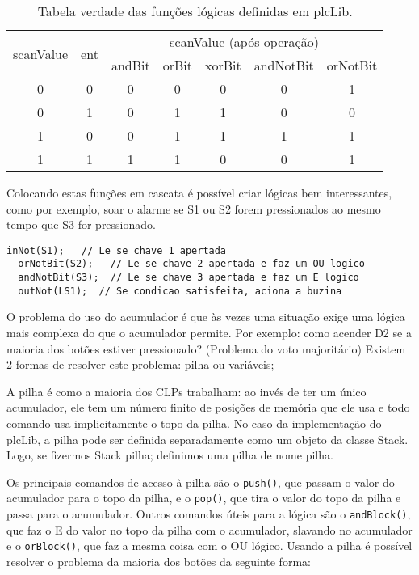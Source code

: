 \begin{table}[h]
\caption{Tabela verdade das funções lógicas definidas em plcLib.}\label{tab:logicas}
\centering
\begin{tabular}{|cc|ccccc|}
\hline
\multirow{2}{*}{scanValue} & \multirow{2}{*}{ent} & \multicolumn{5}{|c|}{scanValue (após operação)} \\
 &  & andBit & orBit & xorBit & andNotBit & orNotBit\\
 \hline
0 & 0 & 0 & 0 & 0 & 0 & 1\\
0 & 1 & 0 & 1 & 1 & 0 & 0\\
1 & 0 & 0 & 1 & 1 & 1 & 1\\
1 & 1 & 1 & 1 & 0 & 0 & 1\\
\hline
\end{tabular}
\end{table}

Colocando estas funções em cascata é possível criar lógicas bem interessantes, como por exemplo, soar o alarme se S1 ou S2 forem pressionados ao mesmo tempo que S3 for pressionado.
\begin{lstlisting}[caption=Aciona a buzina em função das chaves., label=lst:buzina]
  inNot(S1);   // Le se chave 1 apertada
  orNotBit(S2);   // Le se chave 2 apertada e faz um OU logico
  andNotBit(S3);  // Le se chave 3 apertada e faz um E logico
  outNot(LS1);  // Se condicao satisfeita, aciona a buzina
\end{lstlisting}

O problema do uso do acumulador é que às vezes uma situação exige uma lógica mais complexa do que o acumulador permite. Por exemplo: como acender D2 se a maioria dos botões estiver pressionado? (Problema do voto majoritário)
Existem 2 formas de resolver este problema: pilha ou variáveis;

A pilha é como a maioria dos CLPs trabalham: ao invés de ter um único acumulador, ele tem um número finito de posições de memória que ele usa e todo comando usa implicitamente o topo da pilha. No caso da implementação do plcLib, a pilha pode ser definida separadamente como um objeto da classe Stack. Logo, se fizermos Stack pilha; definimos uma pilha de nome pilha.

Os principais comandos de acesso à pilha são o \lstinline|push()|, que passam o valor do acumulador para o topo da pilha, e o \lstinline|pop()|, que tira o valor do topo da pilha e passa para o acumulador. Outros comandos úteis para a lógica são o \lstinline|andBlock()|, que faz o E do valor no topo da pilha com o acumulador, slavando no acumulador e o \lstinline|orBlock()|, que faz a mesma coisa com o OU lógico. Usando a pilha é possível resolver o problema da maioria dos botões da seguinte forma:

